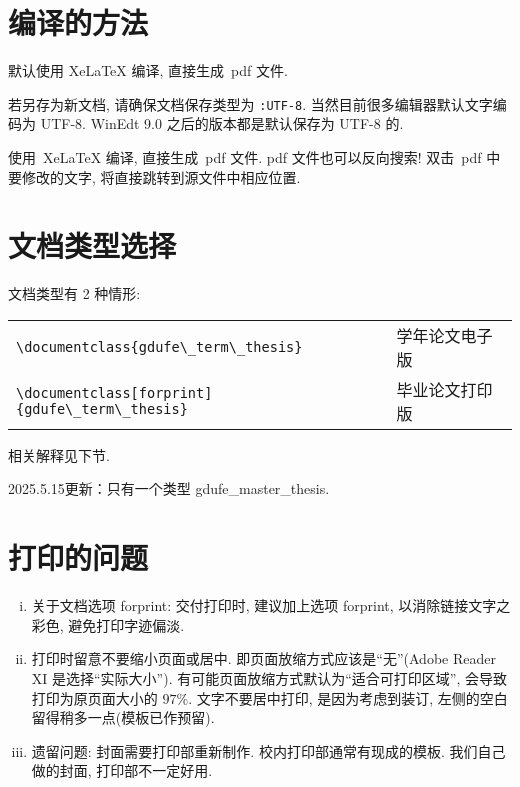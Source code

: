 \documentclass[class = professional, oneside]{gdufe_master_thesis}
\begin{document}
\section{编译的方法}\label{sec-compile}

默认使用 XeLaTeX 编译, 直接生成~pdf 文件.

若另存为新文档, 请确保文档保存类型为 \verb|:UTF-8|. 当然目前很多编辑器默认文字编码为 UTF-8.
WinEdt 9.0 之后的版本都是默认保存为 UTF-8 的.

使用~XeLaTeX 编译, 直接生成~pdf 文件.
pdf 文件也可以反向搜索! 双击~pdf 中要修改的文字, 将直接跳转到源文件中相应位置.

\section{文档类型选择}
文档类型有 2 种情形:

\begin{table}[ht]\centering
    \begin{tabular}{ll}
        \hline
        \verb|\documentclass{gdufe\_term\_thesis}|           & 学年论文电子版 \\
        \verb|\documentclass[forprint]{gdufe\_term\_thesis}| & 毕业论文打印版 \\
        \hline
    \end{tabular}
\end{table}
相关解释见下节.

2025.5.15更新：只有一个类型 gdufe\_master\_thesis.

\section{打印的问题}
\begin{enumerate}[i)]
    \item  关于文档选项 forprint: 交付打印时, 建议加上选项 forprint, 以消除链接文字之彩色, 避免打印字迹偏淡.
    \item  打印时留意不要缩小页面或居中. 即页面放缩方式应该是``无''(Adobe Reader XI 是选择``实际大小'').
          有可能页面放缩方式默认为``适合可打印区域'', 会导致打印为原页面大小的 $97\%$.
          文字不要居中打印, 是因为考虑到装订, 左侧的空白留得稍多一点(模板已作预留).
    \item  遗留问题: 封面需要打印部重新制作.  校内打印部通常有现成的模板.
          我们自己做的封面, 打印部不一定好用.
\end{enumerate}
\end{document}
